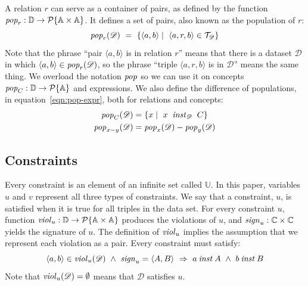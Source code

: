\documentclass[runningheads]{llncs}
\newcommand{\id}[1]{\text{\it #1\/}}
\newcommand{\popF}[1]{\id{pop}_{#1}}
\newcommand{\pop}[2]{\popF{#1}(#2)}
\newcommand{\instance}{\mathbin{\id{inst}}}
\newcommand{\viol}[2]{\violC{#1}(#2)}
\newcommand{\violC}[1]{\id{viol}_{#1}}
\newcommand{\sign}[1]{\id{sign}_{#1}}
\newcommand{\powerset}[1]{\cal{P}\{#1\}}
\newcommand{\declare}[3]{\id{#1}_{\pair{#2}{#3}}}
\newcommand{\pair}[2]{\langle{#1},{#2}\rangle}
\newcommand{\Pair}[2]{#1\times#2}
\newcommand{\triple}[3]{\langle{#1},{#2},{#3}\rangle}
\newcommand{\Atoms}{\mathbb{A}}
\newcommand{\Concepts}{\mathbb{C}}
\newcommand{\triples}{\mathcal{T}}
\newcommand{\Constraints}{\mathbb{U}}
\newcommand{\dataset}{\mathscr{D}}
\newcommand{\Dataset}{\mathbb{D}}
\begin{document}
   A relation $r$ can serve as a container of pairs,
   as defined by the function $\popF{r}:\Dataset\rightarrow\powerset{\Pair{\Atoms}{\Atoms}}$.
   It defines a set of pairs, also known as the population of $r$:
\begin{equation}
   \pop{r}{\dataset}\ =\ \{ \pair{a}{b}\mid\ \triple{a}{r}{b}\in\triples_{\dataset}\}
\label{eqn:pop-rel}
\end{equation}
   Note that the phrase ``pair $\pair{a}{b}$ is in relation $r$'' means that there is a dataset $\dataset$ in which $\pair{a}{b}\in\pop{r}{\dataset}$,
   so the phrase ``triple $\triple{a}{r}{b}$ is in $\dataset$'' means the same thing.
%
   We overload the notation $\popF{}$ so we can use it on concepts $\popF{C}:\Dataset\rightarrow\powerset{\Atoms}$
   and expressions. We also define the difference of populations, in equation~\ref{eqn:pop-expr}, both for relations and concepts:
\begin{align}
   \pop{C}{\dataset}&= \{ x\mid\ x\ \instance_{\dataset}\ C\}
\label{eqn:pop-concept}\\
   \pop{x-y}{\dataset}&= \pop{x}{\dataset} - \pop{y}{\dataset}
\label{eqn:pop-expr}
\end{align}

\subsection{Constraints}
\label{sct:Constraints}
   Every constraint is an element of an infinite set called $\Constraints$.
   In this paper, variables $u$ and $v$ represent all three types of constraints.
   We say that a constraint, $u$, is satisfied when it is true for all triples in the data set.
   For every constraint $u$, function $\violC{u}:\Dataset\rightarrow\powerset{\Pair{\Atoms}{\Atoms}}$ produces the violations of $u$,
   and $\sign{u}:\Pair{\Concepts}{\Concepts}$ yields the signature of $u$.
   The definition of $\violC{u}$ implies the assumption that we represent each violation as a pair.
   Every constraint must satisfy:
\begin{equation}
   \pair{a}{b}\in\viol{u}{\dataset}\ \wedge\ \sign{u}=\pair{A}{B}\ \Rightarrow\ a\instance A\ \wedge\ b\instance B
\label{eqn:wellTypedViolation}
\end{equation}
   Note that $\viol{u}{\dataset}=\emptyset$ means that $\dataset$ satisfies $u$.
\end{document}
